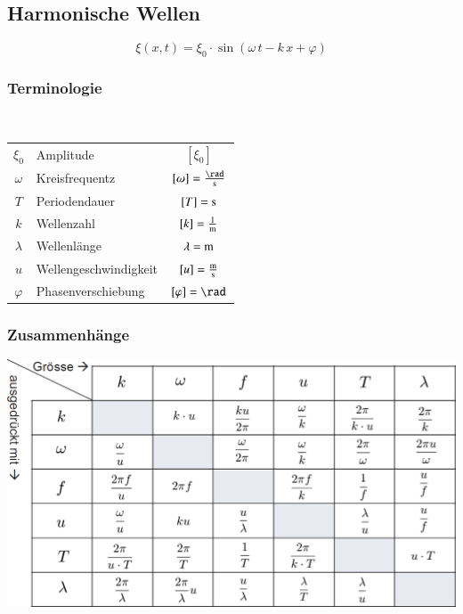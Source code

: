 \subsection{Harmonische Wellen}

$$ \boxed{ \xi(x, t) = \xi_0 \cdot \sin( \omega \, t - k \, x + \varphi) }  $$


\subsubsection{Terminologie}

 \\
\raggedright

\renewcommand{\arraystretch}{1.1}
\begin{tabular}{c l c}
$\xi_0$ & Amplitude & $[\xi_0]$ \\
$\omega$ & Kreisfrequentz & $[\omega] = \frac{\rad}{\s}$ \\
$T$ & Periodendauer & $[T] = \mathrm{s}$ \\
$k$ & Wellenzahl & $[k] = \frac{1}{\mathrm{m}}$ \\
$\lambda$ & Wellenlänge & $\lambda = \mathrm{m} $ \\
$u$ & Wellengeschwindigkeit & $[u] = \frac{\mathrm{m}}{\mathrm{s}}$ \\
$\varphi$ & Phasenverschiebung & $[\varphi] = \rad$ 
\end{tabular}
\renewcommand{\arraystretch}{1}



\subsubsection{Zusammenhänge}
\includegraphics[width=0.8\linewidth]{Bilder/Wellen-Optik/harmonische_wellen_zusammenhaenge}






